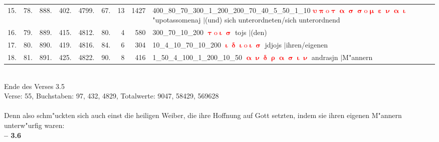 \documentclass[a4paper,10pt,landscape]{article}
\begin{document}
\begin{tabular}{rrrrrrrrp{120mm}}
15.&78.&888.&402.&4799.&67.&13&1427&400\_80\_70\_300\_1\_200\_200\_70\_40\_5\_50\_1\_10 \textcolor{red}{$\boldsymbol{\upsilon\uppi\mathrm{o}\uptau\upalpha\upsigma\upsigma\mathrm{o}\upmu\upepsilon\upnu\upalpha\upiota}$} "upotassomenaj $|$(und) sich unterordneten/sich unterordnend\\
16.&79.&889.&415.&4812.&80.&4&580&300\_70\_10\_200 \textcolor{red}{$\boldsymbol{\uptau\mathrm{o}\upiota\upsigma}$} tojs $|$(den)\\
17.&80.&890.&419.&4816.&84.&6&304&10\_4\_10\_70\_10\_200 \textcolor{red}{$\boldsymbol{\upiota\updelta\upiota\mathrm{o}\upiota\upsigma}$} jdjojs $|$ihren/eigenen\\
18.&81.&891.&425.&4822.&90.&8&416&1\_50\_4\_100\_1\_200\_10\_50 \textcolor{red}{$\boldsymbol{\upalpha\upnu\updelta\uprho\upalpha\upsigma\upiota\upnu}$} andrasjn $|$M"annern\\
\end{tabular}\medskip \\
Ende des Verses 3.5\\
Verse: 55, Buchstaben: 97, 432, 4829, Totalwerte: 9047, 58429, 569628\\
\\
Denn also schm"uckten sich auch einst die heiligen Weiber, die ihre Hoffnung auf Gott setzten, indem sie ihren eigenen M"annern unterw"urfig waren:\\
\newpage 
{\bf -- 3.6}\\
\medskip \\
\end{document}
